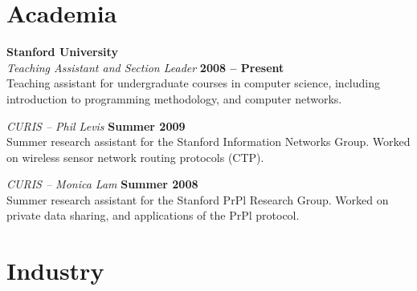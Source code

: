 \documentclass[margin,line]{resume}
\begin{document}
\begin{resume}




    \section{\mysidestyle Academia}

    \textbf{Stanford University} \vspace{2mm}\\\vspace{1mm}%
    \textsl{Teaching Assistant and Section Leader} \hfill \textbf{2008 -- Present}\\
    Teaching assistant for undergraduate courses in computer science, including introduction to programming methodology, and computer networks.

    \textsl{CURIS -- Phil Levis} \hfill \textbf{Summer 2009}\\
    Summer research assistant for the Stanford Information Networks Group. Worked on wireless sensor network routing protocols (CTP).

    \textsl{CURIS -- Monica Lam} \hfill \textbf{Summer 2008}\\
    Summer research assistant for the Stanford PrPl Research Group. Worked on private data sharing, and applications of the PrPl protocol.

    \section{\mysidestyle Industry}


\end{resume}
\end{document}
